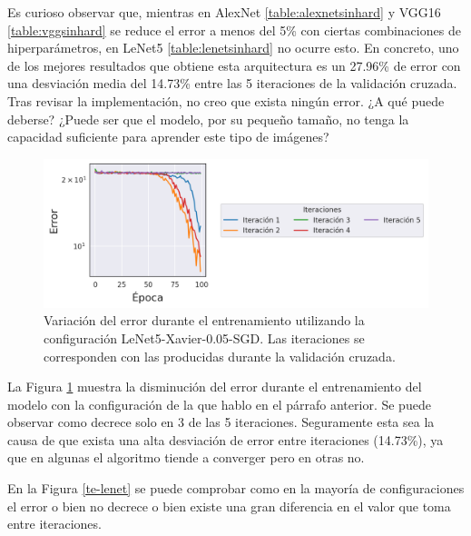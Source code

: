 Es curioso observar que, mientras en AlexNet \ref{table:alexnetsinhard} y VGG16 \ref{table:vggsinhard} se reduce el error a menos del 5\% con ciertas combinaciones de hiperparámetros, en LeNet5 \ref{table:lenetsinhard} no ocurre esto. En concreto, uno de los mejores resultados que obtiene esta arquitectura es un 27.96\% de error con una desviación media del 14.73\% entre las 5 iteraciones de la validación cruzada. Tras revisar la implementación, no creo que exista ningún error. ¿A qué puede deberse? ¿Puede ser que el modelo, por su pequeño tamaño, no tenga la capacidad suficiente para aprender este tipo de imágenes?

\begin{figure}[H]
\centering
    \includegraphics[scale=0.65]{imagenes/image_classification/original_dataset/loss1.png}
    \caption{Variación del error durante el entrenamiento utilizando la configuración LeNet5-Xavier-0.05-SGD. Las iteraciones se corresponden con las producidas durante la validación cruzada.}
    \label{fig:te-LeNet5-Xavier-0.05-SGD}
\end{figure}

La Figura \ref{fig:te-LeNet5-Xavier-0.05-SGD} muestra la disminución del error durante el entrenamiento del modelo con la configuración de la que hablo en el párrafo anterior. Se puede observar como decrece solo en 3 de las 5 iteraciones. Seguramente esta sea la causa de que exista una alta desviación de error entre iteraciones (14.73\%), ya que en algunas el algoritmo tiende a converger pero en otras no.

En la Figura \ref{te-lenet} se puede comprobar como en la mayoría de configuraciones el error o bien no decrece o bien existe una gran diferencia en el valor que toma entre iteraciones.

